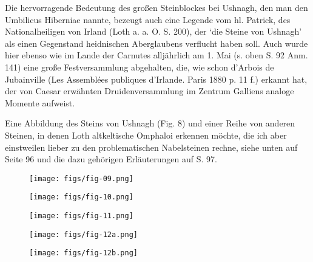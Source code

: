 \documentclass[a4paper, 11pt, oneside]{article}
\begin{document}
Die hervorragende Bedeutung des großen Steinblockes bei Ushnagh, den man den Umbilicus Hiberniae nannte, bezeugt auch eine Legende vom hl. Patrick, des Nationalheiligen von Irland (Loth a. a. O. S. 200), der `die Steine von Ushnagh' als einen Gegenstand heidnischen Aberglaubens verflucht haben soll. Auch wurde hier ebenso wie im Lande der Carnutes alljährlich am 1. Mai (s. oben S. 92 Anm. 141) eine große Festversammlung abgehalten, die, wie schon d'Arbois de Jubainville (Les Assemblées publiques d'Irlande. Paris 1880 p. 11 f.) erkannt hat, der von Caesar erwähnten Druidenversammlung im Zentrum Galliens analoge Momente aufweist.

Eine Abbildung des Steins von Ushnagh (Fig. 8) und einer Reihe von anderen Steinen, in denen Loth altkeltische Omphaloi erkennen möchte, die ich aber einstweilen lieber zu den problematischen Nabelsteinen rechne, siehe unten auf Seite 96 und die dazu gehörigen Erläuterungen auf S. 97.
\clearpage
\vspace*{\fill}
\begin{figure}[H]
\centering
\texttt{[image: figs/fig-09.png]}
\caption{}
\end{figure}
\begin{figure}[H]
\centering
\texttt{[image: figs/fig-10.png]}
\caption{}
\end{figure}
\vspace*{\fill}
\clearpage
\vspace*{\fill}
\begin{figure}[H]
\centering
\texttt{[image: figs/fig-11.png]}
\caption{}
\end{figure}
\vspace*{\fill}
\clearpage
\vspace*{\fill}
\begin{figure}[H]
\centering
\texttt{[image: figs/fig-12a.png]}
\caption{}
\end{figure}
\begin{figure}[H]
\centering
\texttt{[image: figs/fig-12b.png]}
\caption{}
\end{figure}
\vspace*{\fill}
\clearpage
\end{document}
